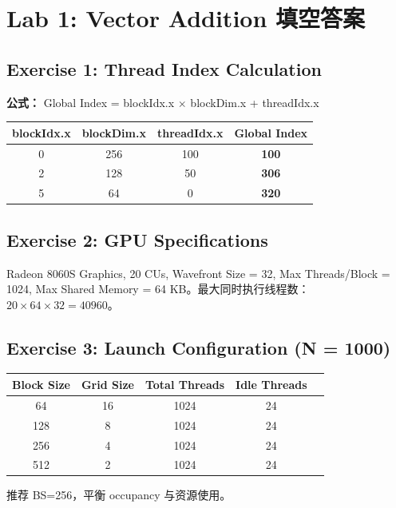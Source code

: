 \documentclass[a4paper]{article}
\begin{document}



\newpage
\appendix
\section{Lab 1: Vector Addition 填空答案}

\subsection*{Exercise 1: Thread Index Calculation}
\textbf{公式：} Global Index = blockIdx.x $\times$ blockDim.x + threadIdx.x

\begin{tabular}{|c|c|c|c|}
\hline
blockIdx.x & blockDim.x & threadIdx.x & Global Index \\
\hline
0 & 256 & 100 & \textbf{100} \\
2 & 128 & 50 & \textbf{306} \\
5 & 64 & 0 & \textbf{320} \\
\hline
\end{tabular}

\subsection*{Exercise 2: GPU Specifications}
Radeon 8060S Graphics, 20 CUs, Wavefront Size = 32, Max Threads/Block = 1024, Max Shared Memory = 64 KB。最大同时执行线程数：$20 \times 64 \times 32 = 40960$。

\subsection*{Exercise 3: Launch Configuration (N = 1000)}
\begin{tabular}{|c|c|c|c|c|}
\hline
Block Size & Grid Size & Total Threads & Idle Threads \\
\hline
64 & 16 & 1024 & 24 \\
128 & 8 & 1024 & 24 \\
256 & 4 & 1024 & 24 \\
512 & 2 & 1024 & 24 \\
\hline
\end{tabular}
推荐 BS=256，平衡 occupancy 与资源使用。
\end{document}
